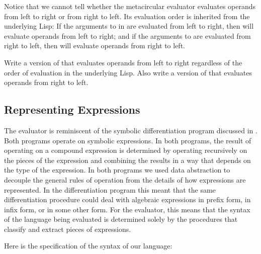 \begin{exerciseGroup}
\label{Exercise 4.1}
 Notice that we cannot tell whether
the metacircular evaluator evaluates operands from left to right or from right
to left.  Its evaluation order is inherited from the underlying Lisp: If the
arguments to  in  are evaluated from left to
right, then  will evaluate operands from left to right;
and if the arguments to  are evaluated from right to left, then
 will evaluate operands from right to left.

Write a version of  that evaluates operands from left to
right regardless of the order of evaluation in the underlying Lisp.  Also write
a version of  that evaluates operands from right to left.
\end{exerciseGroup}

\subsection{Representing Expressions}
\label{Section 4.1.2}

The evaluator is reminiscent of the symbolic differentiation program discussed
in .  Both programs operate on symbolic expressions.  In
both programs, the result of operating on a compound expression is determined
by operating recursively on the pieces of the expression and combining the
results in a way that depends on the type of the expression.  In both programs
we used data abstraction to decouple the general rules of operation from the
details of how expressions are represented.  In the differentiation program
this meant that the same differentiation procedure could deal with algebraic
expressions in prefix form, in infix form, or in some other form.  For the
evaluator, this means that the syntax of the language being evaluated is
determined solely by the procedures that classify and extract pieces of
expressions.

Here is the specification of the syntax of our language:

